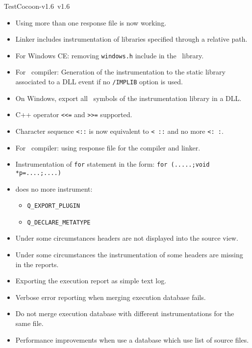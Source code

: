\begin{TestCocoonDownload}
\begin{ReleaseNote}{TestCocoon-v1.6}{\TestCocoon\ v1.6}
\begin{description}
\begin{itemize}
    \item \BugFix Using more than one response file is now working.
    \item \BugFix Linker includes instrumentation of libraries specified through a relative path.
    \item \BugFix For Windows CE: removing \verb$windows.h$ include in the \CoverageScanner\ library.
    \item \BugFix For \VisualStudio\ compiler: Generation of the instrumentation to the static library associated to a DLL event if no \verb$/IMPLIB$ option is used.
    \item \BugFix On Windows, export all \CoverageScanner\ symbols of the instrumentation library in a DLL.
    \item \BugFix C++ operator \verb$<<=$ and \verb$>>=$ supported.
    \item \BugFix Character sequence \verb$<::$ is now equivalent to \verb$< ::$ and no more \verb$<: :$.
    \item \BugFix For \VisualStudio\ compiler: using response file for the compiler and linker.
    \item \BugFix Instrumentation of \verb$for$ statement in the form: \verb$for (.....;void *p=....;....)$
    \item \BugFix {} does no more instrument:
                  \begin{itemize}
                    \item \verb$Q_EXPORT_PLUGIN$
                    \item \verb$Q_DECLARE_METATYPE$
                  \end{itemize}
  \end{itemize}
\item[\CoverageBrowser]
  \begin{itemize}
    \item \BugFix     Under some circumstances headers are not displayed into the source view.
    \item \BugFix     Under some circumstances the instrumentation of some headers are missing in the reports.
    \item \NewFeature Exporting the execution report as simple text log.
    \item \NewFeature Verbose error reporting when merging execution database fails.
    \item \BugFix     Do not merge execution database with different instrumentations for the same file.
    \item \Profiling  Performance improvements when use a database which use list of source files.

\end{itemize}
\end{description}
\end{ReleaseNote}
\end{TestCocoonDownload}
